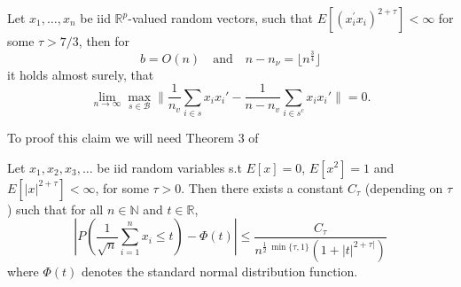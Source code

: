 \documentclass[Research_Module_ES.tex]{subfiles}
\begin{document}
\begin{claim}\label{Lala}
Let $x_1,\ldots,x_n$ be iid $\mathbb{R}^p$-valued random vectors, such that $E[(x^\prime_i x_i)^{2+\tau}]<\infty$ for some $\tau>7/3$, then for 
\[
	b=O(n)\quad\textrm{and}\quad n-n_\nu=\lfloor n^{\frac{3}{4}}\rfloor
\]
it holds almost surely, that
\[
\lim_{n\to\infty} \max_{s\in \mathcal{B}}\biggl\lVert \frac{1}{n_v}\sum_{i\in s}x_ix_i' - \frac{1}{n-n_v}\sum_{i\in s^c}x_ix_i'\biggr\rVert =0. \label{gram_matrix_condition_BICV}
\]
\end{claim}
To proof this claim we will need Theorem 3 of \cite{michel1976nonuniform}
\begin{thm}\label{Michel76Thm3}
	Let $x_1,x_2,x_3,\ldots$ be iid random variables s.t $E[x]=0$, $E[x^2]=1$ and $E[|x|^{2+\tau}]<\infty$, for some $\tau>0$. Then there exists a constant $C_\tau$ (depending on $\tau$) such that for all $n\in \mathbb{N}$ and $t\in\mathbb{R}$,
	\[
	\left| P\left( \frac{1}{\sqrt{n}}\sum_{i=1}^{n}x_i\leq t \right) -\Phi(t) \right| \leq \frac{C_\tau}{n^{\frac{1}{2}~ \min\{\tau,1\}} (1+|t|^{2+\tau|}) }
	\] 
	where $\Phi (t)$ denotes the standard normal distribution function.
\end{thm}	
\end{document}
